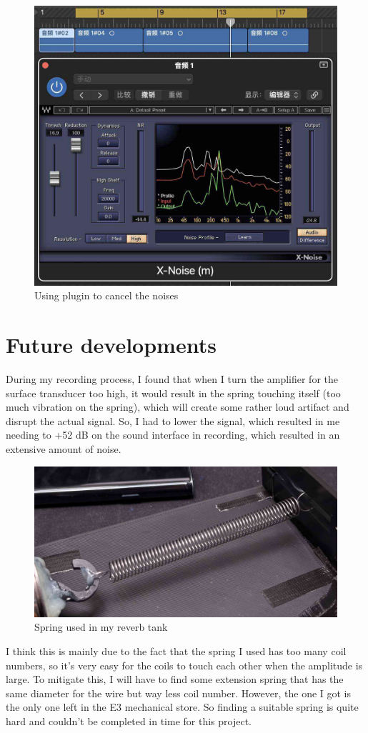 \documentclass[11pt,a4paper]{article}
\begin{document}
\begin{figure}[h]
\center
	\includegraphics[width=0.5\linewidth]{xnoise.jpg}
	\caption{Using plugin to cancel the noises}
\end{figure}


\section{Future developments}

During my recording process, I found that when I turn the amplifier for the surface transducer too high, it would result in the spring touching itself (too much vibration on the spring), which will create some rather loud artifact and disrupt the actual signal. So, I had to lower the signal, which resulted in me needing to +52 dB on the sound interface in recording, which resulted in an extensive amount of noise. 

\begin{figure}[h] 
	\center 
	\includegraphics[width=0.5\linewidth]{spring.jpg} 
	\caption{Spring used in my reverb tank} 
\end{figure} 


I think this is mainly due to the fact that the spring I used has too many coil numbers, so it's very easy for the coils to touch each other when the amplitude is large. To mitigate this, I will have to find some extension spring that has the same diameter for the wire but way less coil number. However, the one I got is the only one left in the E3 mechanical store. So finding a suitable spring is quite hard and couldn't be completed in time for this project. 
\end{document}
